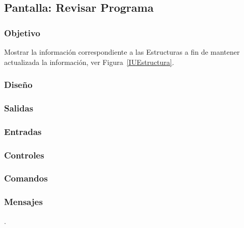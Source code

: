 \subsection{Pantalla: Revisar Programa}

\subsubsection{Objetivo}
Mostrar la información correspondiente a las Estructuras a fin de mantener actualizada la información, ver Figura~\ref{IUEstructura}. 

\subsubsection{Diseño}

\subsubsection{Salidas}


\subsubsection{Entradas}

\subsubsection{Controles}


\subsubsection{Comandos}


\subsubsection{Mensajes}

.

